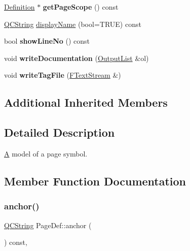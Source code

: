 \begin{DoxyCompactItemize}
\mbox{\hyperlink{class_definition}{Definition}} $\ast$ {\bfseries get\+Page\+Scope} () const
\item 
\mbox{\hyperlink{class_q_c_string}{Q\+C\+String}} \mbox{\hyperlink{class_page_def_a29e7f4617718d605639095833d42d0a0}{display\+Name}} (bool=T\+R\+UE) const
\item 
\mbox{\label{class_page_def_a90452058dc8b09f05bda65d6f09f11f3}} 
bool {\bfseries show\+Line\+No} () const
\item 
\mbox{\label{class_page_def_a112d939dc57b93ef2e84682e0c54868c}} 
void {\bfseries write\+Documentation} (\mbox{\hyperlink{class_output_list}{Output\+List}} \&ol)
\item 
\mbox{\label{class_page_def_aae9b036bbdf72ebb7062f3e8952dcca5}} 
void {\bfseries write\+Tag\+File} (\mbox{\hyperlink{class_f_text_stream}{F\+Text\+Stream}} \&)
\end{DoxyCompactItemize}
\subsection*{Additional Inherited Members}


\subsection{Detailed Description}
\mbox{\hyperlink{class_a}{A}} model of a page symbol. 

\subsection{Member Function Documentation}
\mbox{\label{class_page_def_a1de6c2c0acdb782e053af47271fb0a3d}} 
\subsubsection{\texorpdfstring{anchor()}{anchor()}}
{\footnotesize\ttfamily \mbox{\hyperlink{class_q_c_string}{Q\+C\+String}} Page\+Def\+::anchor (\begin{DoxyParamCaption}{ }\end{DoxyParamCaption}) const\hspace{0.3cm}{\ttfamily [inline]}, {\ttfamily [virtual]}}


